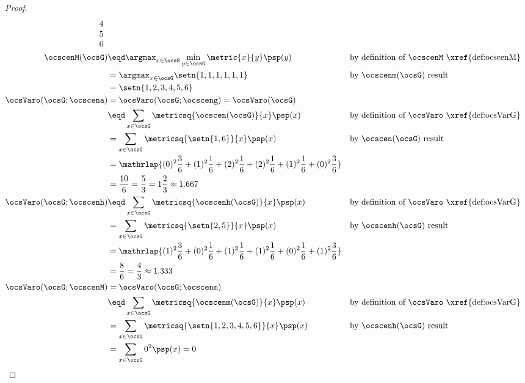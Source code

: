 \begin{tabstr}{0.75}
\begin{proof}
\begin{align*}
{{\begin{array}{c}
           4\\
           5\\
           6\\
         \end{array}}}
  \\
  \ocscenM(\ocsG)
    &\eqd \argmax_{x\in\ocsG}\min_{y\in\ocsG}\metric{x}{y}\psp(y)
    &&\text{by definition of $\ocscenM$ \xref{def:ocscenM}}
  \\&= \argmax_{x\in\ocsG}\setn{1,1,1,1,1,1}
    && \text{by $\ocscenm(\ocsG)$ result}
  \\&= \setn{1,2,3,4,5,6}
  \\
    \ocsVaro(\ocsG;\ocscena) 
      &= \ocsVaro(\ocsG;\ocsceng) = \ocsVaro(\ocsG)
    \\&\eqd \sum_{x\in\ocsG}\metricsq{\ocscen(\ocsG)}{x}\psp(x)
      &&\text{by definition of $\ocsVaro$ \xref{def:ocsVarG}}
    \\&= \sum_{x\in\ocsG}\metricsq{\setn{1,6}}{x}\psp(x)
      &&\text{by $\ocscen(\ocsG)$ result}
    \\&= \mathrlap{(0)^2\frac{3}{6}+(1)^2\frac{1}{6}+(2)^2\frac{1}{6}+(2)^2\frac{1}{6}+(1)^2\frac{1}{6}+(0)^2\frac{3}{6}}
    \\&= \frac{10}{6}= \frac{5}{3}= 1\frac{2}{3}\approx 1.667
  \\
    \ocsVaro(\ocsG;\ocscenh)
      &\eqd \sum_{x\in\ocsG}\metricsq{\ocscenh(\ocsG)}{x}\psp(x)
      &&\text{by definition of $\ocsVaro$ \xref{def:ocsVarG}}
    \\&= \sum_{x\in\ocsG}\metricsq{\setn{2,5}}{x}\psp(x)
      &&\text{by $\ocscenh(\ocsG)$ result}
    \\&= \mathrlap{(1)^2\frac{3}{6}+(0)^2\frac{1}{6}+(1)^2\frac{1}{6}+(1)^2\frac{1}{6}+(0)^2\frac{1}{6}+(1)^2\frac{3}{6}}
    \\&= \frac{8}{6}= \frac{4}{3} \approx 1.333
  \\
    \ocsVaro(\ocsG;\ocscenM)
      &= \ocsVaro(\ocsG;\ocscenm)
    \\&\eqd \sum_{x\in\ocsG}\metricsq{\ocscenm(\ocsG)}{x}\psp(x)
      &&\text{by definition of $\ocsVaro$ \xref{def:ocsVarG}}
    \\&= \sum_{x\in\ocsG}\metricsq{\setn{1,2,3,4,5,6}}{x}\psp(x)
      &&\text{by $\ocscenh(\ocsG)$ result}
    \\&= \sum_{x\in\ocsG}0^2\psp(x)
       = 0
  \end{align*}
\end{proof}




\end{tabstr}
